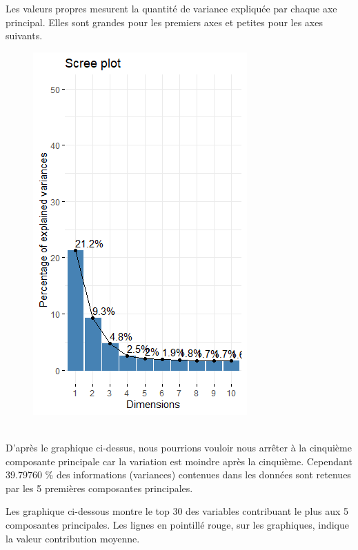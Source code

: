 \documentclass[12pt]{article}
\begin{document}
Les valeurs propres mesurent la quantité de variance expliquée par chaque axe principal. Elles sont grandes pour les premiers axes et petites pour les axes suivants.


\begin{figure}[H]
\begin{center}
\includegraphics[scale=1.4]{ACP_1.png} 
\caption[]{\ }
\end{center}
\end{figure}

D'après le graphique ci-dessus, nous pourrions vouloir nous 
arrêter à la cinquième composante principale  car la variation est moindre après la cinquième.
Cependant 39.79760 \% des informations (variances) contenues
dans les données sont retenues par les 5  premières composantes principales.


Les graphique ci-dessous montre le top 30 des variables contribuant le plus aux 5 composantes principales. 
Les lignes en pointillé rouge, sur les graphiques, indique  la valeur  contribution moyenne.
 
\end{document}
